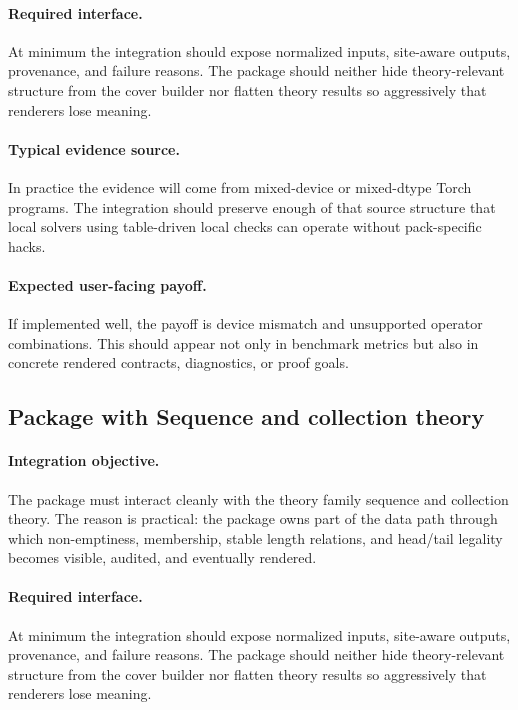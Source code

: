 \documentclass[11pt]{report}
\DeclareRobustCommand{\py}[1]{\texttt{\detokenize{#1}}}
\theoremstyle{definition}
\theoremstyle{plain}
\begin{document}
\paragraph{Required interface.}
At minimum the integration should expose normalized inputs, site-aware
outputs, provenance, and failure reasons. The package should neither hide
theory-relevant structure from the cover builder nor flatten theory
results so aggressively that renderers lose meaning.

\paragraph{Typical evidence source.}
In practice the evidence will come from mixed-device or mixed-dtype Torch programs. The integration should
preserve enough of that source structure that local solvers using table-driven local checks
can operate without pack-specific hacks.

\paragraph{Expected user-facing payoff.}
If implemented well, the payoff is device mismatch and unsupported operator combinations. This should appear not only
in benchmark metrics but also in concrete rendered contracts,
diagnostics, or proof goals.


\subsection{Package \py{src/deppy/core} with Sequence and collection theory}

\paragraph{Integration objective.}
The package \py{src/deppy/core} must interact cleanly with the
theory family sequence and collection theory. The reason is practical: the
package owns part of the data path through which non-emptiness, membership, stable length relations, and head/tail legality becomes
visible, audited, and eventually rendered.

\paragraph{Required interface.}
At minimum the integration should expose normalized inputs, site-aware
outputs, provenance, and failure reasons. The package should neither hide
theory-relevant structure from the cover builder nor flatten theory
results so aggressively that renderers lose meaning.
\end{document}
